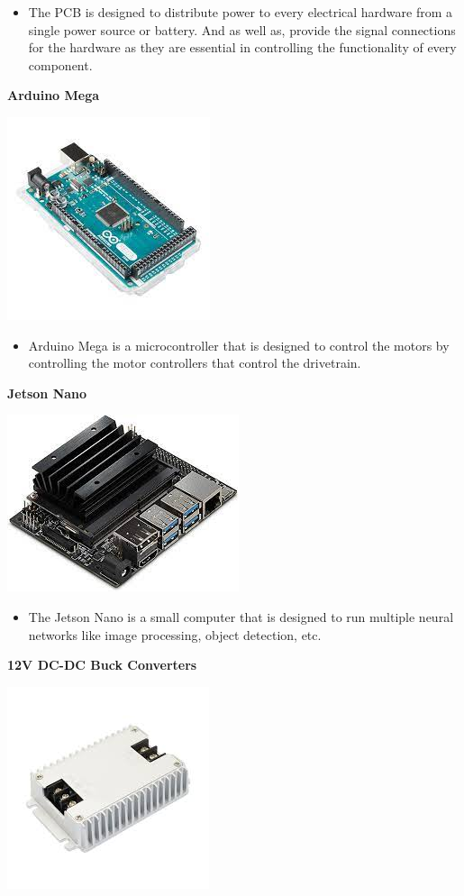 \documentclass[a4paper, 10pt]{article}
\begin{document}
\begin{itemize}
\item
	The PCB is designed to distribute power to every electrical hardware from a single power source or battery. And as well as, provide the signal connections for the hardware as they are essential in controlling the functionality of every component.
\end{itemize}


\textbf{Arduino Mega}

\includegraphics[scale=0.5]{Arduino Mega}

\begin{itemize}
\item
	Arduino Mega is a microcontroller that is designed to control the motors by controlling the motor controllers that control the drivetrain.
\end{itemize}


\textbf{Jetson Nano}

\includegraphics[scale=0.5]{Jetson Nano}

\begin{itemize}
\item
	The Jetson Nano is a small computer that is designed to run multiple neural networks like image processing, object detection, etc. 
\end{itemize}


\textbf{12V DC-DC Buck Converters}

\includegraphics[scale=0.5]{12V DC-DC buck converter}
\end{document}
